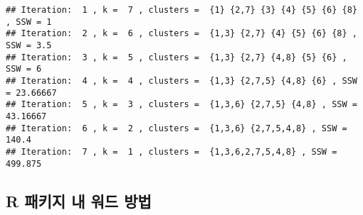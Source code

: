 \documentclass[
]{book}
\newenvironment{Shaded}{\begin{snugshade}}{\end{snugshade}}
\newcommand{\AttributeTok}[1]{\textcolor[rgb]{0.77,0.63,0.00}{#1}}
\newcommand{\CommentTok}[1]{\textcolor[rgb]{0.56,0.35,0.01}{\textit{#1}}}
\newcommand{\ControlFlowTok}[1]{\textcolor[rgb]{0.13,0.29,0.53}{\textbf{#1}}}
\newcommand{\DecValTok}[1]{\textcolor[rgb]{0.00,0.00,0.81}{#1}}
\newcommand{\FunctionTok}[1]{\textcolor[rgb]{0.00,0.00,0.00}{#1}}
\newcommand{\NormalTok}[1]{#1}
\newcommand{\OtherTok}[1]{\textcolor[rgb]{0.56,0.35,0.01}{#1}}
\newcommand{\SpecialCharTok}[1]{\textcolor[rgb]{0.00,0.00,0.00}{#1}}
\newcommand{\StringTok}[1]{\textcolor[rgb]{0.31,0.60,0.02}{#1}}
\begin{document}
\begin{Shaded}
\end{Shaded}

\begin{verbatim}
## Iteration:  1 , k =  7 , clusters =  {1} {2,7} {3} {4} {5} {6} {8} , SSW = 1 
## Iteration:  2 , k =  6 , clusters =  {1,3} {2,7} {4} {5} {6} {8} , SSW = 3.5 
## Iteration:  3 , k =  5 , clusters =  {1,3} {2,7} {4,8} {5} {6} , SSW = 6 
## Iteration:  4 , k =  4 , clusters =  {1,3} {2,7,5} {4,8} {6} , SSW = 23.66667 
## Iteration:  5 , k =  3 , clusters =  {1,3,6} {2,7,5} {4,8} , SSW = 43.16667 
## Iteration:  6 , k =  2 , clusters =  {1,3,6} {2,7,5,4,8} , SSW = 140.4 
## Iteration:  7 , k =  1 , clusters =  {1,3,6,2,7,5,4,8} , SSW = 499.875
\end{verbatim}

\hypertarget{ward-rpackages}{%
\subsection{R 패키지 내 워드 방법}\label{ward-rpackages}}
\end{document}
